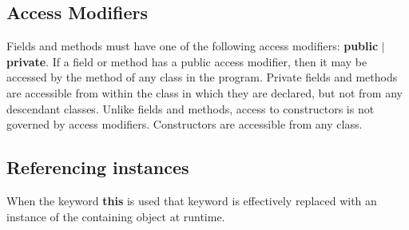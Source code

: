 \begin{homeworkProblem}
	\subsection{Access Modifiers}
	Fields and methods must have one of the following access modifiers: \textbf{public} $|$ \textbf{private}. If a field or method has a public access modifier, then it may be accessed by the method of any class in the program. Private fields and methods are accessible from within the class in which they are declared, but not from any descendant classes.
	\newline
	Unlike fields and methods, access to constructors is not governed by access modifiers. Constructors are accessible from any class.
	
	
	\subsection{Referencing instances}
	When the keyword \textbf{this} is used that keyword is effectively replaced with an instance of the containing object at runtime. 
	
\end{homeworkProblem}
